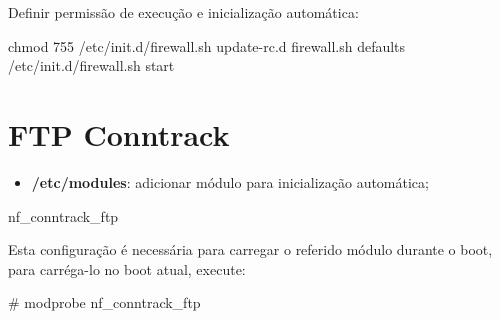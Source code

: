     Definir permissão de execução e inicialização automática:

\begin{VerbatimNumerado}
chmod 755 /etc/init.d/firewall.sh
update-rc.d firewall.sh defaults
/etc/init.d/firewall.sh start
\end{VerbatimNumerado}

\section{FTP Conntrack}\setcounter{SteP}{1}

\begin{itemize}
\item{\bf } {\bf /etc/modules}: adicionar módulo para inicialização automática;
\end{itemize}

\begin{BoxVerbatim}
nf_conntrack_ftp
\end{BoxVerbatim}

    Esta configuração é necessária para carregar o referido módulo durante o boot,
para carréga-lo no boot atual, execute:

\begin{BoxVerbatim}
# modprobe nf_conntrack_ftp
\end{BoxVerbatim}
